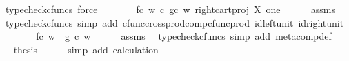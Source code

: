 \begin{isabellebody}
\ {\isacharparenleft}{\kern0pt}typecheck{\isacharunderscore}{\kern0pt}cfuncs{\isacharcomma}{\kern0pt}\ force{\isacharparenright}{\kern0pt}\isanewline
\ \ \isamarkupfalse%
\ \isamarkupfalse%
\ {\isachardoublequoteopen}{\isachardot}{\kern0pt}{\isachardot}{\kern0pt}{\isachardot}{\kern0pt}\ {\isacharequal}{\kern0pt}\ {\isacharparenleft}{\kern0pt}{\isacharparenleft}{\kern0pt}f{\isasymcirc}\isactrlsub c\ w{\isacharparenright}{\kern0pt}\isactrlsup {\isasymflat}\ {\isasymcirc}\isactrlsub c\ {\isasymlangle}{\isacharparenleft}{\kern0pt}g{\isasymcirc}\isactrlsub c\ w{\isacharparenright}{\kern0pt}\isactrlsup {\isasymflat}{\isacharcomma}{\kern0pt}\ right{\isacharunderscore}{\kern0pt}cart{\isacharunderscore}{\kern0pt}proj\ X\ one{\isasymrangle}{\isacharparenright}{\kern0pt}\isactrlsup {\isasymsharp}{\isachardoublequoteclose}\isanewline
\ \ \ \ \isamarkupfalse%
\ assms\ \isamarkupfalse%
\ {\isacharparenleft}{\kern0pt}typecheck{\isacharunderscore}{\kern0pt}cfuncs{\isacharcomma}{\kern0pt}\ simp\ add{\isacharcolon}{\kern0pt}\ cfunc{\isacharunderscore}{\kern0pt}cross{\isacharunderscore}{\kern0pt}prod{\isacharunderscore}{\kern0pt}comp{\isacharunderscore}{\kern0pt}cfunc{\isacharunderscore}{\kern0pt}prod\ id{\isacharunderscore}{\kern0pt}left{\isacharunderscore}{\kern0pt}unit{}\ id{\isacharunderscore}{\kern0pt}right{\isacharunderscore}{\kern0pt}unit{}{\isacharparenright}{\kern0pt}\isanewline
\ \ \isamarkupfalse%
\ \isamarkupfalse%
\ {\isachardoublequoteopen}{\isachardot}{\kern0pt}{\isachardot}{\kern0pt}{\isachardot}{\kern0pt}\ {\isacharequal}{\kern0pt}\ {\isacharparenleft}{\kern0pt}f{\isasymcirc}\isactrlsub c\ w{\isacharparenright}{\kern0pt}\ {\isasymbox}\ {\isacharparenleft}{\kern0pt}g\ {\isasymcirc}\isactrlsub c\ w{\isacharparenright}{\kern0pt}{\isachardoublequoteclose}\isanewline
\ \ \ \ \isamarkupfalse%
\ assms\ \isamarkupfalse%
\ {\isacharparenleft}{\kern0pt}typecheck{\isacharunderscore}{\kern0pt}cfuncs{\isacharcomma}{\kern0pt}\ simp\ add{\isacharcolon}{\kern0pt}\ meta{\isacharunderscore}{\kern0pt}comp{}{\isacharunderscore}{\kern0pt}def{}{\isacharparenright}{\kern0pt}\isanewline
\ \ \isamarkupfalse%
\ \isamarkupfalse%
\ {\isacharquery}{\kern0pt}thesis\isanewline
\ \ \ \ \isamarkupfalse%
\ {\isacharparenleft}{\kern0pt}simp\ add{\isacharcolon}{\kern0pt}\ calculation{\isacharparenright}{\kern0pt}\isanewline
{}\isamarkupfalse%
%
\endisatagproof

\end{isabellebody}

